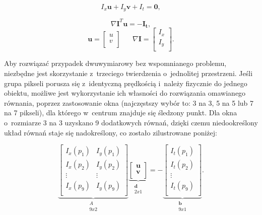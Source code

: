     \[ I_{x}\mathbf{u} + I_{y}\mathbf{v} + I_{t} = \mathbf{0}, \]

    \[ \nabla \mathbf{I}^{T} \mathbf{u} = -\mathbf{I_{t}}, \]
    \[
      \mathbf{u} =
        \begin{bmatrix}
          u \\
          v \\
        \end{bmatrix}
      \hspace{20pt}
      \nabla \mathbf{I} =
        \begin{bmatrix}
          I_{x} \\
          I_{y} \\
        \end{bmatrix}.
    \]

    Aby rozwiązać przypadek dwuwymiarowy bez wspomnianego problemu, niezbędne jest skorzystanie z~trzeciego twierdzenia o~jednolitej przestrzeni. Jeśli grupa pikseli porusza się z~identyczną prędkością i~należy fizycznie do jednego obiektu, możliwe jest wykorzystanie ich własności do rozwiązania omawianego równania, poprzez zastosowanie okna (najczęstszy wybór to: 3 na 3, 5 na 5 lub 7 na 7 pikseli), dla którego w~centrum znajduje się śledzony punkt. Dla okna o~rozmiarze 3 na 3 uzyskano 9 dodatkowych równań, dzięki czemu niedookreślony układ równań staje się nadokreślony, co zostało zilustrowane poniżej:

    \[
      \underbrace{
        \begin{bmatrix}
          I_{x}(p_{1}) & I_{y}(p_{1}) \\
          I_{x}(p_{2}) & I_{y}(p_{2}) \\
          \vdots       & \vdots       \\
          I_{x}(p_{9}) & I_{y}(p_{9}) \\
        \end{bmatrix}}_{\substack{A\\9x2}}
      \underbrace{
        \begin{bmatrix}
          \mathbf{u} \\
          \mathbf{v} \\
        \end{bmatrix}}_{\substack{\mathbf{d}\\2x1}} =
      -\underbrace{
        \begin{bmatrix}
          I_{t}(p_{1}) \\
          I_{t}(p_{2}) \\
          \vdots       \\
          I_{t}(p_{9}) \\
        \end{bmatrix}}_{\substack{\mathbf{b}\\9x1}}.
    \]

